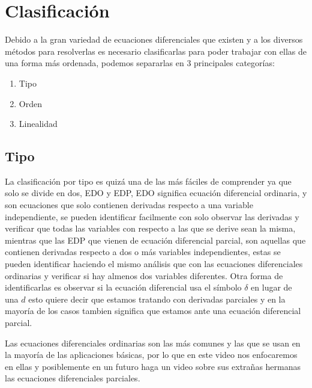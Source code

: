 \documentclass[12pt, letterpaper]{article}
\begin{document}
    \section{Clasificación}
        \noindent
            Debido a la gran variedad de ecuaciones diferenciales que existen y a los diversos métodos para resolverlas es necesario clasificarlas para poder trabajar con ellas de una forma más ordenada, podemos separarlas en 3 principales categorías:
            \begin{enumerate}
                \item Tipo
                \item Orden
                \item Linealidad
            \end{enumerate}
        \subsection{Tipo}
            \noindent
                La clasificación por tipo es quizá una de las más fáciles de comprender ya que solo se divide en dos, EDO y EDP, EDO significa ecuación diferencial ordinaria, y son ecuaciones que solo contienen derivadas respecto a una variable independiente, se pueden identificar facilmente con solo observar las derivadas y verificar que todas las variables con respecto a las que se derive sean la misma, mientras que las EDP que vienen de ecuación diferencial parcial, son aquellas que contienen derivadas respecto a dos o más variables independientes, estas se pueden identificar haciendo el mismo análisis que con las ecuaciones diferenciales ordinarias y verificar si hay almenos dos variables diferentes. Otra forma de identificarlas es observar si la ecuación diferencial usa el símbolo $\delta$ en lugar de una $d$ esto quiere decir que estamos tratando con derivadas parciales y en la mayoría de los casos tambien significa que estamos ante una ecuación diferencial parcial.
            \par
                Las ecuaciones diferenciales ordinarias son las más comunes y las que se usan en la mayoría de las aplicaciones básicas, por lo que en este video nos enfocaremos en ellas y posiblemente en un futuro haga un video sobre sus extrañas hermanas las ecuaciones diferenciales parciales.
\end{document}
